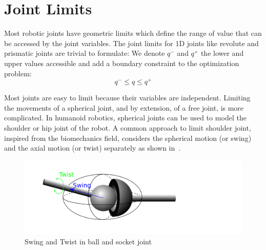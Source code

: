 

\section{Joint Limits}
\label{sec:joint_limits}


Most robotic joints have geometric limits which define the range of value that can be accessed by the joint variables.
The joint limits for 1D joints like revolute and prismatic joints are trivial to formulate: We denote $q^-$ and $q^+$ the lower and upper values accessible and add a boundary constraint to the optimization problem:
\begin{equation}
\label{eq:joint_limits}
  \boxed{q^- \leq q \leq q^+}
\end{equation}

Most joints are easy to limit because their variables are independent.
Limiting the movements of a spherical joint, and by extension, of a free joint, is more complicated.
In humanoid robotics, spherical joints can be used to model the shoulder or hip joint of the robot.
A common approach to limit shoulder joint, inspired from the biomechanics field, considers the spherical motion (or swing) and the axial motion (or twist) separately as shown in~.

\begin{figure}[htpb]
  \centering
  \includegraphics[width=0.7\linewidth]{ballAndSocket.pdf}
  \caption{Swing and Twist in ball and socket joint}
\label{fig:ballAndSocket}
\end{figure}

